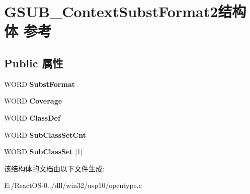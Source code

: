 \hypertarget{struct_g_s_u_b___context_subst_format2}{}\section{G\+S\+U\+B\+\_\+\+Context\+Subst\+Format2结构体 参考}
\label{struct_g_s_u_b___context_subst_format2}
\subsection*{Public 属性}
\begin{DoxyCompactItemize}
\item 
\mbox{\label{struct_g_s_u_b___context_subst_format2_ab6c4898a8f904fc03e829871267f5527}} 
W\+O\+RD {\bfseries Subst\+Format}
\item 
\mbox{\label{struct_g_s_u_b___context_subst_format2_a860114343131c1f0e216ad7a4bc60e37}} 
W\+O\+RD {\bfseries Coverage}
\item 
\mbox{\label{struct_g_s_u_b___context_subst_format2_a427bd079e4b191d049db40e7eca497a6}} 
W\+O\+RD {\bfseries Class\+Def}
\item 
\mbox{\label{struct_g_s_u_b___context_subst_format2_a87ab66eb40b55e106a3c2d9911bfb902}} 
W\+O\+RD {\bfseries Sub\+Class\+Set\+Cnt}
\item 
\mbox{\label{struct_g_s_u_b___context_subst_format2_a10e839bde82b08b7e993ca62564e08df}} 
W\+O\+RD {\bfseries Sub\+Class\+Set} \mbox{[}1\mbox{]}
\end{DoxyCompactItemize}


该结构体的文档由以下文件生成\+:\begin{DoxyCompactItemize}
\item 
E\+:/\+React\+O\+S-\/0../dll/win32/usp10/opentype.\+c\end{DoxyCompactItemize}
